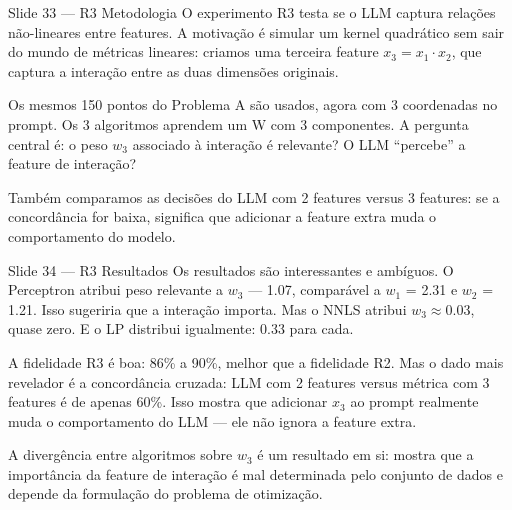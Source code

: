 \documentclass[aspectratio=169,11pt]{beamer}
\begin{document}
\begin{frame}{Slide 33 --- R3 Metodologia}
\small
O experimento R3 testa se o LLM captura relações não-lineares entre features. A motivação é simular um kernel quadrático sem sair do mundo de métricas lineares: criamos uma terceira feature $x_3 = x_1 \cdot x_2$, que captura a interação entre as duas dimensões originais.

Os mesmos 150 pontos do Problema A são usados, agora com 3 coordenadas no prompt. Os 3 algoritmos aprendem um W com 3 componentes. A pergunta central é: o peso $w_3$ associado à interação é relevante? O LLM ``percebe'' a feature de interação?

Também comparamos as decisões do LLM com 2 features versus 3 features: se a concordância for baixa, significa que adicionar a feature extra muda o comportamento do modelo.
\end{frame}

\begin{frame}{Slide 34 --- R3 Resultados}
\small
Os resultados são interessantes e ambíguos. O Perceptron atribui peso relevante a $w_3$ --- 1.07, comparável a $w_1$ = 2.31 e $w_2$ = 1.21. Isso sugeriria que a interação importa. Mas o NNLS atribui $w_3 \approx 0.03$, quase zero. E o LP distribui igualmente: 0.33 para cada.

A fidelidade R3 é boa: 86\% a 90\%, melhor que a fidelidade R2. Mas o dado mais revelador é a concordância cruzada: LLM com 2 features versus métrica com 3 features é de apenas 60\%. Isso mostra que adicionar $x_3$ ao prompt realmente muda o comportamento do LLM --- ele não ignora a feature extra.

A divergência entre algoritmos sobre $w_3$ é um resultado em si: mostra que a importância da feature de interação é mal determinada pelo conjunto de dados e depende da formulação do problema de otimização.
\end{frame}
\end{document}
